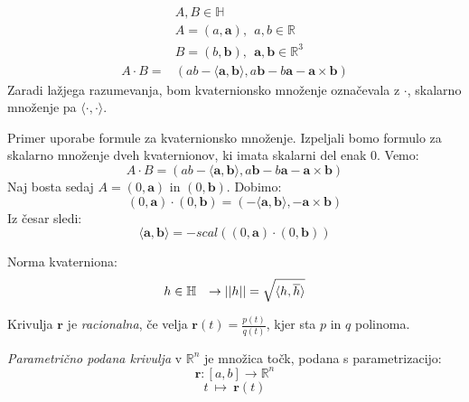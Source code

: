 \documentclass[mat1]{fmfdelo}
\newcommand{\R}{\mathbb R}
\newcommand{\HH}{\mathbb H}
\newcommand{\rr}{\boldsymbol r}
\begin{document}
\begin{equation*}
\begin{split}
& A,B \in \HH \\
&A = (a, \boldsymbol{a}), ~~ a,b \in \R \\
&B = (b, \boldsymbol{b}), ~~ \boldsymbol{a}, \boldsymbol{b} \in \R^3\\
A\cdot B = & \left( ab- \langle \boldsymbol{a},\boldsymbol{b} \rangle, a\boldsymbol{b}-b\boldsymbol{a}-\boldsymbol{a}\times \boldsymbol{b}  \right)
\end{split}
\end{equation*}
Zaradi lažjega razumevanja, bom kvaternionsko množenje označevala z $\cdot$, skalarno množenje pa $\langle\cdot,\cdot\rangle$.
\begin{primer}
	Primer uporabe formule za kvaternionsko množenje. Izpeljali bomo formulo za skalarno množenje dveh kvaternionov, ki imata skalarni del enak 0.
	Vemo:
	\begin{equation*}
	A\cdot B =  \left( ab- \langle \boldsymbol{a},\boldsymbol{b} \rangle, a\boldsymbol{b}-b\boldsymbol{a}-\boldsymbol{a}\times \boldsymbol{b}  \right)
	\end{equation*}
	Naj bosta sedaj $A = (0,\boldsymbol{a})$ in $(0,\boldsymbol{b})$. Dobimo:
	\begin{equation*}
	(0,\boldsymbol{a}) \cdot (0,\boldsymbol{b}) = \left( -\langle \boldsymbol{a}, \boldsymbol{b} \rangle , -\boldsymbol{a} \times \boldsymbol{b} \right)
	\end{equation*}
	Iz česar sledi:
	\begin{equation*}
	\langle \boldsymbol{a},\boldsymbol{b} \rangle = -scal\left( (0,\boldsymbol{a}) \cdot (0,\boldsymbol{b}) \right)
	\end{equation*}
\end{primer}
Norma kvaterniona:
\begin{equation*}
\begin{array}{c c}
h \in \HH & \rightarrow ||h|| = \sqrt{\langle h, \overline{h}\rangle}
\end{array}
\end{equation*}
\begin{definicija}
Krivulja $\rr$ je \textit{racionalna}, če velja $\rr(t) = \frac{p(t)}{q(t)}$, kjer sta $p$ in $q$ polinoma.
\end{definicija}
\begin{definicija}
\textit{Parametrično podana krivulja} v $\R^n$ je množica točk, podana s parametrizacijo:
\begin{equation*}
\rr: [ a,b ] \rightarrow \R^n
\end{equation*}
\begin{equation*}
t ~ \longmapsto ~\rr(t)
\end{equation*}
\end{definicija}
\end{document}
